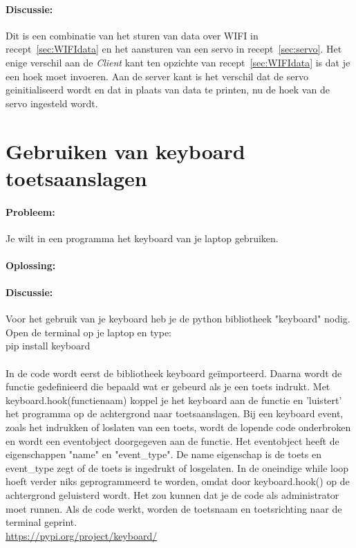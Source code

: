 \paragraph{Discussie:} Dit is een combinatie van het sturen van data over WIFI in recept~\ref{sec:WIFIdata} en het aansturen van een servo in recept~\ref{sec:servo}. Het enige verschil aan de \textit{Client} kant ten opzichte van recept~\ref{sec:WIFIdata} is dat je een hoek moet invoeren. Aan de server kant is het verschil dat de servo geinitialiseerd wordt en dat in plaats van data te printen, nu de hoek van de servo ingesteld wordt. 

\section{Gebruiken van keyboard toetsaanslagen}
\paragraph{Probleem:} Je wilt in een programma het keyboard van je laptop gebruiken.
\paragraph{Oplossing:}

\paragraph{Discussie:} Voor het gebruik van je keyboard heb je de python bibliotheek "keyboard" nodig. Open de terminal op je laptop en type: \newline
\\
pip install keyboard\\
\\
In de code wordt eerst de bibliotheek keyboard ge\"importeerd. Daarna wordt de functie gedefinieerd die bepaald wat er gebeurd als je een toets indrukt. Met keyboard.hook(functienaam) koppel je het keyboard aan de functie en 'luistert' het programma op de achtergrond naar toetsaanslagen. Bij een keyboard event, zoals het indrukken of loslaten van een toets, wordt de lopende code onderbroken en wordt een eventobject doorgegeven aan de functie. Het eventobject heeft de eigenschappen "name" en "event\_type". De name eigenschap is de toets en event\_type zegt of de toets is ingedrukt of losgelaten. In de oneindige while loop hoeft verder niks geprogrammeerd te worden, omdat door keyboard.hook() op de achtergrond geluisterd wordt. Het zou kunnen dat je de code als administrator moet runnen. Als de code werkt, worden de toetsnaam en toetsrichting naar de terminal geprint.
\\
\url{https://pypi.org/project/keyboard/}

